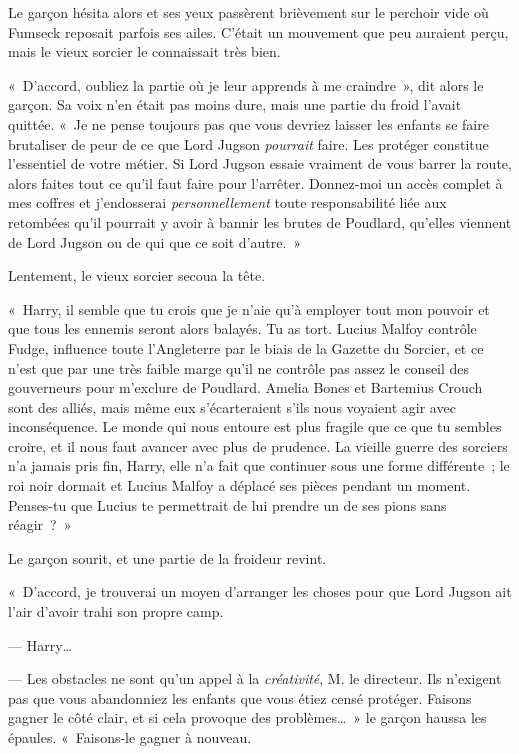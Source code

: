 Le garçon hésita alors et ses yeux passèrent brièvement sur le perchoir vide où Fumseck reposait parfois ses ailes. C'était un mouvement que peu auraient perçu, mais le vieux sorcier le connaissait très bien.

«~D'accord, oubliez la partie où je leur apprends à me craindre~», dit alors le garçon. Sa voix n'en était pas moins dure, mais une partie du froid l'avait quittée. «~Je ne pense toujours pas que vous devriez laisser les enfants se faire brutaliser de peur de ce que Lord Jugson \emph{pourrait} faire. Les protéger constitue l'essentiel de votre métier. Si Lord Jugson essaie vraiment de vous barrer la route, alors faites tout ce qu'il faut faire pour l'arrêter. Donnez-moi un accès complet à mes coffres et j'endosserai \emph{personnellement} toute responsabilité liée aux retombées qu'il pourrait y avoir à bannir les brutes de Poudlard, qu'elles viennent de Lord Jugson ou de qui que ce soit d'autre.~»

Lentement, le vieux sorcier secoua la tête.

«~Harry, il semble que tu crois que je n'aie qu'à employer tout mon pouvoir et que tous les ennemis seront alors balayés. Tu as tort. Lucius Malfoy contrôle Fudge, influence toute l'Angleterre par le biais de la Gazette du Sorcier, et ce n'est que par une très faible marge qu'il ne contrôle pas assez le conseil des gouverneurs pour m'exclure de Poudlard. Amelia Bones et Bartemius Crouch sont des alliés, mais même eux s'écarteraient s'ils nous voyaient agir avec inconséquence. Le monde qui nous entoure est plus fragile que ce que tu sembles croire, et il nous faut avancer avec plus de prudence. La vieille guerre des sorciers n'a jamais pris fin, Harry, elle n'a fait que continuer sous une forme différente~; le roi noir dormait et Lucius Malfoy a déplacé ses pièces pendant un moment. Penses-tu que Lucius te permettrait de lui prendre un de ses pions sans réagir~?~»

Le garçon sourit, et une partie de la froideur revint.

«~D'accord, je trouverai un moyen d'arranger les choses pour que Lord Jugson ait l'air d'avoir trahi son propre camp.

--- Harry…

--- Les obstacles ne sont qu'un appel à la \emph{créativité}, M. le directeur. Ils n'exigent pas que vous abandonniez les enfants que vous étiez censé protéger. Faisons gagner le côté clair, et si cela provoque des problèmes…~» le garçon haussa les épaules. «~Faisons-le gagner à nouveau.

